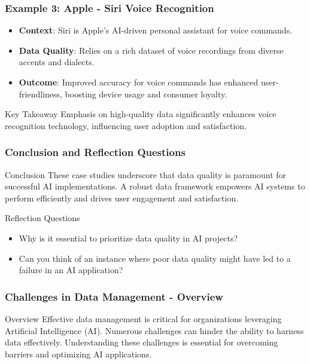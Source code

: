 \documentclass[aspectratio=169]{beamer}
\begin{document}
\begin{frame}[fragile]
    \frametitle{Example 3: Apple - Siri Voice Recognition}
    \begin{itemize}
        \item \textbf{Context}: Siri is Apple's AI-driven personal assistant for voice commands.
        \item \textbf{Data Quality}: Relies on a rich dataset of voice recordings from diverse accents and dialects.
        \item \textbf{Outcome}: Improved accuracy for voice commands has enhanced user-friendliness, boosting device usage and consumer loyalty.
    \end{itemize}
    \begin{block}{Key Takeaway}
        Emphasis on high-quality data significantly enhances voice recognition technology, influencing user adoption and satisfaction.
    \end{block}
\end{frame}

\begin{frame}[fragile]
    \frametitle{Conclusion and Reflection Questions}
    \begin{block}{Conclusion}
        These case studies underscore that data quality is paramount for successful AI implementations. 
        A robust data framework empowers AI systems to perform efficiently and drives user engagement and satisfaction.
    \end{block}
    \begin{block}{Reflection Questions}
        \begin{itemize}
            \item Why is it essential to prioritize data quality in AI projects?
            \item Can you think of an instance where poor data quality might have led to a failure in an AI application?
        \end{itemize}
    \end{block}
\end{frame}

\begin{frame}[fragile]
    \frametitle{Challenges in Data Management - Overview}
    \begin{block}{Overview}
        Effective data management is critical for organizations leveraging Artificial Intelligence (AI). 
        Numerous challenges can hinder the ability to harness data effectively. 
        Understanding these challenges is essential for overcoming barriers and optimizing AI applications.
    \end{block}
\end{frame}
\end{document}

